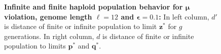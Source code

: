 \begin{figure}[h]
\begin{center}
\hspace{-3em}%
\vspace{-0.5em} \hspace{-3em}%


\caption[\textbf{Infinite and finite haploid population behavior for $\bm{\mu}$ violation, genome length $\ell = 12$ and $\bm{\epsilon} = 0.1$}]{\textbf{Infinite and finite haploid population behavior for $\bm{\mu}$ violation, genome length $\ell = 12$ and $\bm{\epsilon} = 0.1$:} 
  In left column, $d'$ is distance of finite or infinite population to limit $\bm{z}^\ast$ for $g$ generations. In right column, $d$ is distance of finite or infinite population to limits $\bm{p}^\ast$ and $\bm{q}^\ast$.}
\label{oscillation_12h_vio_mu_0.1}
\end{center}
\end{figure}

